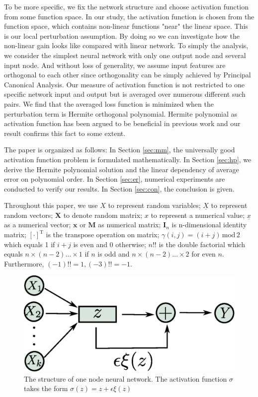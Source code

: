 \documentclass[conference]{IEEEtran}
\def\T{\mathrm{T}}
\newcommand{\ide}[2]{ \gamma(#1,#2) }
\begin{document}
To be more specific, we fix the network structure and choose activation function from some function space.
In our study, the activation function is chosen from the function space, which contains non-linear functions "near" the linear space.
This is our local perturbation assumption. By doing so we can investigate how the non-linear gain looks like compared with linear network.
To simply the analysis, we consider the simplest neural network with only one output node and several input node.
And without loss of generality, we assume input features are orthogonal to each other since orthogonality can be simply achieved by Principal Canonical Analysis.
Our measure of activation function is not restricted to one specific network input and output but is averaged over numerous different such pairs.
We find that the averaged loss function is minimized when the perturbation term is Hermite orthogonal polynomial.
Hermite polynomial as activation function has been argued to be beneficial in previous work \cite{ma2005constructive} and our result confirms this fact to some extent.

The paper is organized as follows: In Section \ref{sec:mm}, the universally good activation function problem
is formulated mathematically.
In Section \ref{sec:hp}, we derive the Hermite polynomial solution and the linear dependency of average error on polynomial order.
In Section \ref{sec:er}, numerical experiments are conducted to verify our results.
In Section \ref{sec:con}, the conclusion is given.

Throughout this paper, we use $X$ to represent random variables;
$\underline{X}$ to represent random vectors;
$\bm{X}$ to denote random matrix;
 $x$ to represent a numerical value;
$\underline{x}$ as a numerical vector;
$\bm{x}$  or $\mathbf{M}$ as numerical matrix; $\mathbf{I}_n$ is n-dimensional identity matrix; 
$[\cdot]^\T$ is the transpose operation on matrix; $\ide{i}{j} = (i+j)\, \mathrm{mod} \, 2$
which equals 1 if $ i + j$ is even and 0 otherwise; 
$n!!$ is the double factorial which equals $n \times (n-2) \dots \times1$ if $n$ is odd and $n \times (n-2)\dots \times 2$ for even $n$. Furthermore, $(-1)!!=1,(-3)!!=-1$.

\begin{figure}\label{fig:ns}
\includegraphics[width=\linewidth]{network_structure.eps}
\caption{The structure of one node neural network. The activation function $\sigma$ takes the form $\sigma(z)=z + \epsilon \xi(z)$}
\end{figure}
\end{document}
